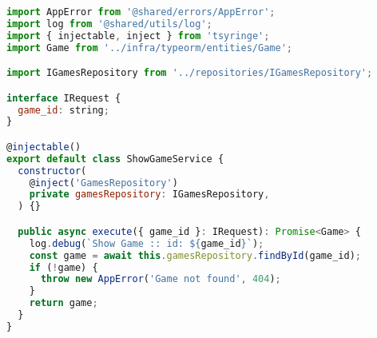 \begin{lstlisting}[language=JavaScript, caption={ShowGameService.ts},captionpos=b, label=alg:showgameservice]
import AppError from '@shared/errors/AppError';
import log from '@shared/utils/log';
import { injectable, inject } from 'tsyringe';
import Game from '../infra/typeorm/entities/Game';

import IGamesRepository from '../repositories/IGamesRepository';

interface IRequest {
  game_id: string;
}

@injectable()
export default class ShowGameService {
  constructor(
    @inject('GamesRepository')
    private gamesRepository: IGamesRepository,
  ) {}

  public async execute({ game_id }: IRequest): Promise<Game> {
    log.debug(`Show Game :: id: ${game_id}`);
    const game = await this.gamesRepository.findById(game_id);
    if (!game) {
      throw new AppError('Game not found', 404);
    }
    return game;
  }
}
\end{lstlisting}